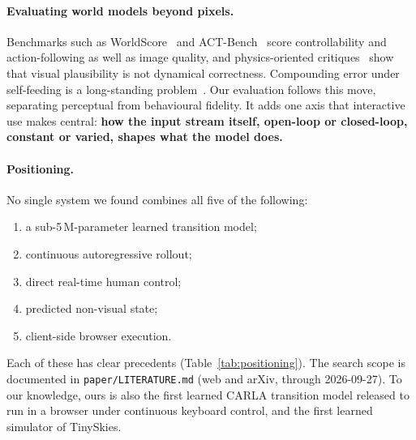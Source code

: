 \documentclass[11pt]{article}
\begin{document}
\paragraph{Evaluating world models beyond pixels.} Benchmarks such as WorldScore~\cite{duan2025worldscore} and ACT-Bench~\cite{arai2024actbench} score controllability and action-following as well as image quality, and physics-oriented critiques~\cite{kang2025physical} show that visual plausibility is not dynamical correctness. Compounding error under self-feeding is a long-standing problem~\cite{bengio2015scheduled,talvitie2017self}. Our evaluation follows this move, separating perceptual from behavioural fidelity. It adds one axis that interactive use makes central: \textbf{how the input stream itself, open-loop or closed-loop, constant or varied, shapes what the model does.}

\paragraph{Positioning.} No single system we found combines all five of the following:
\begin{enumerate}
  \item a sub-5\,M-parameter learned transition model;
  \item continuous autoregressive rollout;
  \item direct real-time human control;
  \item predicted non-visual state;
  \item client-side browser execution.
\end{enumerate}
Each of these has clear precedents (Table~\ref{tab:positioning}). The search scope is documented in \texttt{paper/LITERATURE.md} (web and arXiv, through 2026-09-27). To our knowledge, ours is also the first learned CARLA transition model released to run in a browser under continuous keyboard control, and the first learned simulator of TinySkies.
\end{document}
